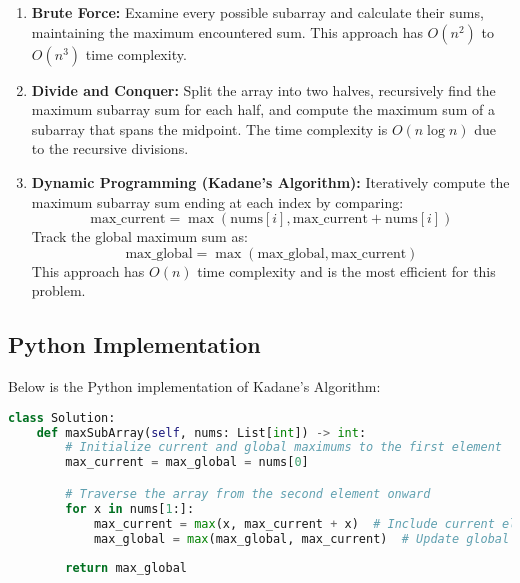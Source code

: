 \begin{enumerate}
    \item \textbf{Brute Force:} Examine every possible subarray and calculate their sums, maintaining the maximum encountered sum. This approach has \(O(n^2)\) to \(O(n^3)\) time complexity.
    
    \item \textbf{Divide and Conquer:} Split the array into two halves, recursively find the maximum subarray sum for each half, and compute the maximum sum of a subarray that spans the midpoint. The time complexity is \(O(n \log n)\) due to the recursive divisions.
    
    \item \textbf{Dynamic Programming (Kadane's Algorithm):} Iteratively compute the maximum subarray sum ending at each index by comparing:
    \[
    \text{max\_current} = \max(\text{nums}[i], \text{max\_current} + \text{nums}[i])
    \]
    Track the global maximum sum as:
    \[
    \text{max\_global} = \max(\text{max\_global}, \text{max\_current})
    \]
    This approach has \(O(n)\) time complexity and is the most efficient for this problem.
\end{enumerate}

\subsection*{Python Implementation}
Below is the Python implementation of Kadane's Algorithm:

\begin{fullwidth}
\begin{lstlisting}[language=Python]
class Solution:
    def maxSubArray(self, nums: List[int]) -> int:
        # Initialize current and global maximums to the first element
        max_current = max_global = nums[0]

        # Traverse the array from the second element onward
        for x in nums[1:]:
            max_current = max(x, max_current + x)  # Include current element or start new subarray
            max_global = max(max_global, max_current)  # Update global maximum if needed
        
        return max_global
\end{lstlisting}
\end{fullwidth}

